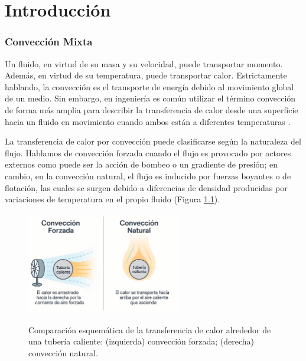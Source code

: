 \chapter{Introducción}
\label{cap:intro}


\subsection*{Convección Mixta}

Un fluido, en virtud de su masa y su velocidad, puede transportar momento. Además, en virtud de su temperatura, puede transportar calor. Estrictamente hablando, la convección es el transporte de energía debido al movimiento global de un medio. Sin embargo, en ingeniería es común utilizar el término convección de forma más amplia para describir la transferencia de calor desde una superficie hacia un fluido en movimiento cuando ambos están a diferentes temperaturas \cite{cengelheat,incropera}. 

La transferencia de calor por convección puede clasificarse según la naturaleza del flujo. Hablamos de convección forzada cuando el flujo es provocado por actores externos como puede ser la acción de bombeo o un gradiente de presión; en cambio, en la convección natural, el flujo es inducido por fuerzas boyantes o de flotación, las cuales se surgen debido a diferencias de densidad producidas por variaciones de temperatura en el propio fluido (Figura \ref{fig:natural_forzada}).

\begin{figure}[H]
 \centering
    \includegraphics[width=0.6\textwidth]{figures/cap1/natural_forzada.png}
    \label{fig:natural_forzada} 
 \caption{Comparación esquemática de la transferencia de calor alrededor de una tubería caliente: (izquierda) convección forzada; (derecha) convección natural.} 
 \label{fig:natural_forzada}
\end{figure}

